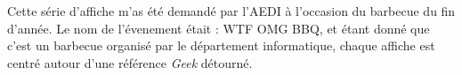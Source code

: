         \begin{center}
        \end{center}
        Cette série d'affiche m'as été demandé par l'AEDI à l'occasion du barbecue du fin d'année.
            Le nom de l'évenement était : WTF OMG BBQ, et étant donné que c'est un barbecue organisé par le département informatique, chaque affiche est centré autour d'une référence \emph{Geek} détourné.
        
